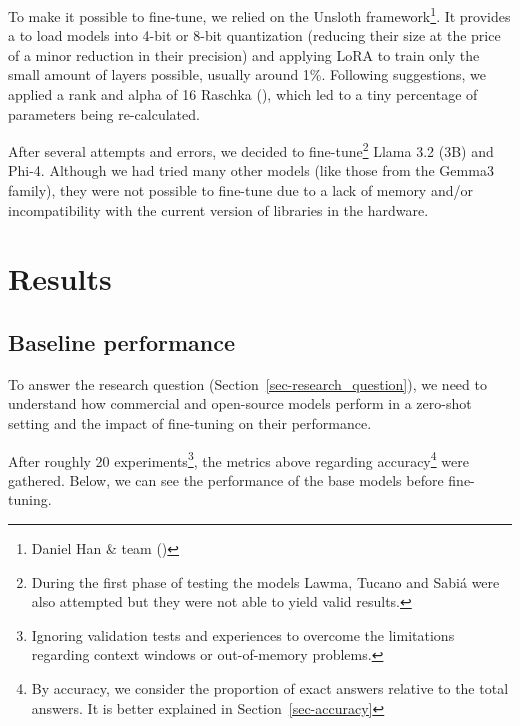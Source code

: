\documentclass[
  12pt,
]{article}
\begin{document}
To make it possible to fine-tune, we relied on the Unsloth
framework\footnote{Daniel Han \& team
  ()}. It provides a to load
models into 4-bit or 8-bit quantization (reducing their size at the
price of a minor reduction in their precision) and applying LoRA to
train only the small amount of layers possible, usually around 1\%.
Following suggestions, we applied a rank and alpha of 16 Raschka
(), which led to a tiny
percentage of parameters being re-calculated.

After several attempts and errors, we decided to fine-tune\footnote{During
  the first phase of testing the models Lawma, Tucano and Sabiá were
  also attempted but they were not able to yield valid results.} Llama
3.2 (3B) and Phi-4. Although we had tried many other models (like those
from the Gemma3 family), they were not possible to fine-tune due to a
lack of memory and/or incompatibility with the current version of
libraries in the hardware.

\section{Results}\label{sec-results}

\subsection{Baseline performance}\label{baseline-performance}

To answer the research question (Section~\ref{sec-research_question}),
we need to understand how commercial and open-source models perform in a
zero-shot setting and the impact of fine-tuning on their performance.

After roughly 20 experiments\footnote{Ignoring validation tests and
  experiences to overcome the limitations regarding context windows or
  out-of-memory problems.}, the metrics above regarding
accuracy\footnote{By accuracy, we consider the proportion of exact
  answers relative to the total answers. It is better explained in
  Section~\ref{sec-accuracy}} were gathered. Below, we can see the
performance of the base models before fine-tuning.
\end{document}
